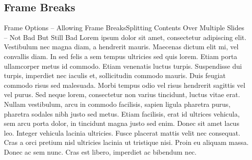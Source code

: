 \documentclass[t]{beamer}
\begin{document}
\subsection{Frame Breaks}

\begin{frame}[allowframebreaks=1]{Frame Options -- Allowing Frame Breaks}{Splitting Contents Over Multiple Slides -- Not Bad But Still Bad}
Lorem ipsum dolor sit amet, consectetur adipiscing elit. Vestibulum nec magna diam, a hendrerit mauris. Maecenas dictum elit mi, vel convallis diam. In sed felis a sem tempus ultricies sed quis lorem. Etiam porta ullamcorper metus id commodo. Etiam venenatis luctus turpis. Suspendisse dui turpis, imperdiet nec iaculis et, sollicitudin commodo mauris. Duis feugiat commodo risus sed malesuada. Morbi tempus odio vel risus hendrerit sagittis vel vel purus. Sed neque lorem, consectetur non varius tincidunt, luctus vitae erat. Nullam vestibulum, arcu in commodo facilisis, sapien ligula pharetra purus, pharetra sodales nibh justo sed metus. Etiam facilisis, erat id ultrices vehicula, sem arcu porta dolor, in tincidunt magna justo sed enim. Donec sit amet lacus leo. Integer vehicula lacinia ultricies. Fusce placerat mattis velit nec consequat. Cras a orci pretium nisl ultricies lacinia ut tristique nisi. Proin eu aliquam massa. Donec ac sem nunc. Cras est libero, imperdiet ac bibendum nec.
\end{frame}
\end{document}
